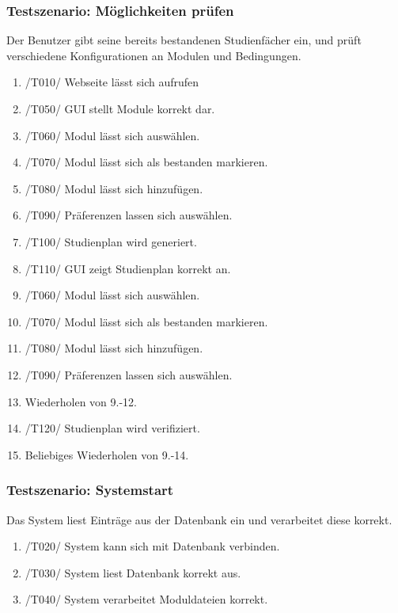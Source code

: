 \documentclass[parskip=full]{scrartcl}
\begin{document}
		\subsubsection{Testszenario: Möglichkeiten prüfen}
	
			Der Benutzer gibt seine bereits bestandenen Studienfächer ein, und prüft verschiedene Konfigurationen an Modulen und Bedingungen.
	
			\begin{enumerate}
				\item /T010/ Webseite lässt sich aufrufen
				\item /T050/ GUI stellt Module korrekt dar.
				\item /T060/ Modul lässt sich auswählen.
				\item /T070/ Modul lässt sich als bestanden markieren.
				\item /T080/ Modul lässt sich hinzufügen.
				\item /T090/ Präferenzen lassen sich auswählen.
				\item /T100/ Studienplan wird generiert.
				\item /T110/ GUI zeigt Studienplan korrekt an.
				\item /T060/ Modul lässt sich auswählen.
				\item /T070/ Modul lässt sich als bestanden markieren.
				\item /T080/ Modul lässt sich hinzufügen.
				\item /T090/ Präferenzen lassen sich auswählen.
				\item Wiederholen von 9.-12.
				\item /T120/ Studienplan wird verifiziert.
				\item Beliebiges Wiederholen von 9.-14.
			\end{enumerate}
	
		\subsubsection{Testszenario: Systemstart}
	
			Das System liest Einträge aus der Datenbank ein und verarbeitet diese korrekt.
		
			\begin{enumerate}
				\item /T020/ System kann sich mit Datenbank verbinden.
				\item /T030/ System liest Datenbank korrekt aus.
				\item /T040/ System verarbeitet Moduldateien korrekt.
			\end{enumerate}
\end{document}
